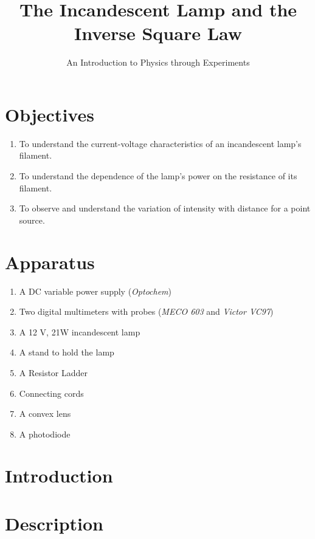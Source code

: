 \title{The Incandescent Lamp and the Inverse Square Law}
\author{An Introduction to Physics through Experiments}
\date{}

\maketitle

\section*{Objectives}

\begin{enumerate}
\item To understand the current-voltage characteristics of an incandescent lamp's filament.
\item To understand the dependence of the lamp's power on the resistance of its filament.
\item To observe and understand the variation of intensity with distance for a point source.
\end{enumerate}




\section*{Apparatus}

\begin{enumerate}
\item A DC variable power supply (\textit{Optochem})
\item Two digital multimeters with probes (\textit{MECO 603} and \textit{Victor VC97})
\item A 12 V, 21W incandescent lamp
\item A stand to hold the lamp
\item A Resistor Ladder
\item Connecting cords
\item A convex lens
\item A photodiode

\end{enumerate}


\section*{Introduction}



\section*{Description}

